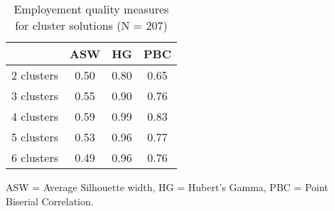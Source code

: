 \begin{table}[htp]
\footnotesize
\setlength{\tabcolsep}{35pt}
\renewcommand{\arraystretch}{1.3}
\begin{threeparttable}
\centering
\caption{Employement quality measures for cluster solutions (N = 207)} 
\label{tab:quality_clusters_job}
\begin{tabular}{lccc}
  \hline
 & ASW & HG & PBC \\ 
  \hline
2 clusters & 0.50 & 0.80 & 0.65 \\ 
  3 clusters & 0.55 & 0.90 & 0.76 \\ 
  4 clusters & 0.59 & 0.99 & 0.83 \\ 
  5 clusters & 0.53 & 0.96 & 0.77 \\ 
  6 clusters & 0.49 & 0.96 & 0.76 \\ 
   \hline
\end{tabular}
\begin{tablenotes}
\scriptsize
\item ASW = Average Silhouette width, HG = Hubert's Gamma, PBC = Point Biserial Correlation.
\end{tablenotes}
\end{threeparttable}
\end{table}
